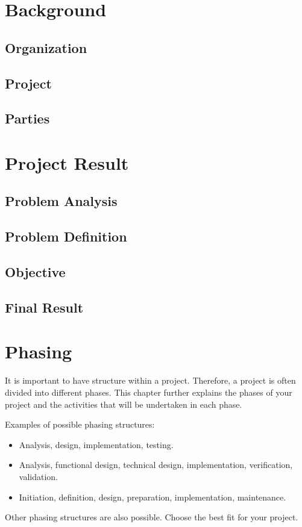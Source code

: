 \documentclass{article}
\begin{document}
\newpage

\tableofcontents

\newpage

\section{Background}
\subsection{Organization}
\subsection{Project}
\subsection{Parties}


\newpage

\section{Project Result}
\subsection{Problem Analysis}
\subsection{Problem Definition}
\subsection{Objective}
\subsection{Final Result}


\newpage

\section{Phasing}
It is important to have structure within a project. Therefore, a project is often divided into different phases. This chapter further explains the phases of your project and the activities that will be undertaken in each phase.

Examples of possible phasing structures:
\begin{itemize}
    \item Analysis, design, implementation, testing.
    \item Analysis, functional design, technical design, implementation, verification, validation.
    \item Initiation, definition, design, preparation, implementation, maintenance.
\end{itemize}
Other phasing structures are also possible. Choose the best fit for your project.
\end{document}
